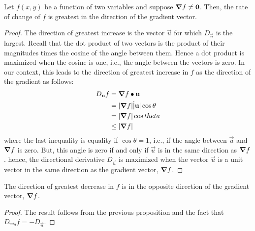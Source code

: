 \documentclass[handout]{ximera}
\begin{document}
\begin{proposition}
Let $f(x,y)$ be a function of two variables and suppose $\boldsymbol\nabla f \neq \mathbf 0$. Then, the rate of change of $f$ is greatest in the direction of the gradient vector.

\end{proposition}

\begin{proof}
The direction of greatest increase is the vector $\vec u$ for which $D_{\vec u}$ is the largest. 
Recall that the dot product of two vectors is the product of their magnitudes times the cosine of the angle between them.  
Hence a dot product is maximized when the cosine is one, i.e., the angle between the vectors is zero.  In our context, this leads to the direction of greatest
increase in $f$ as the direction of the gradient as follows:
\begin{align*}
D_{\mathbf u} f &= \boldsymbol\nabla f \bullet \mathbf u\\
             &= |\boldsymbol\nabla f| \dot |\mathbf u| \cos \theta\\
             &= |\boldsymbol\nabla f| \cos theta\\
             &\leq |\boldsymbol\nabla f|
\end{align*}
where the last inequality is equality if $\cos \theta = 1$, i.e., if the angle between $\vec u$ and $\boldsymbol\nabla f$ is zero.
But, this angle is zero if and only if $\vec u$ is in the same direction as $\boldsymbol\nabla f$.  hence, the directional derivative
$D_{\vec u}$ is maximized when the vector $\vec u$ is a unit vector in the same direction as the gradient vector, $\boldsymbol\nabla f$.
\end{proof}

\begin{corollary}
The direction of greatest decrease in $f$ is in the opposite direction of the gradient vector, $\boldsymbol\nabla f$.
\end{corollary}
\begin{proof}
The result follows from the previous proposition and the fact that $D_{\vec -u} f = -D_{\vec u}$.
\end{proof}
\end{document}
